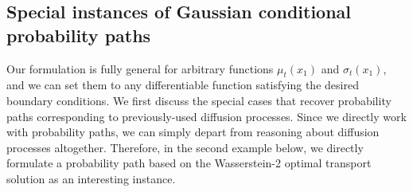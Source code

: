 \documentclass{article}
\newcommand{\yl}[1]{{\color{magenta}{\bf[Yaron:} #1{\bf]}}}
\begin{document}

\subsection{Special instances of Gaussian conditional probability paths}\label{ss:instances}

Our formulation is fully general for arbitrary functions $\mu_t(x_1)$ and $\sigma_t(x_1)$, and we can set them to any differentiable function satisfying the desired boundary conditions. 
We first discuss the special cases that recover probability paths corresponding to previously-used diffusion processes. 
Since we directly work with probability paths, we can simply depart from reasoning about diffusion processes altogether. Therefore, in the second example below, we directly formulate a probability path based on the Wasserstein-2 optimal transport solution as an interesting instance.
\end{document}
